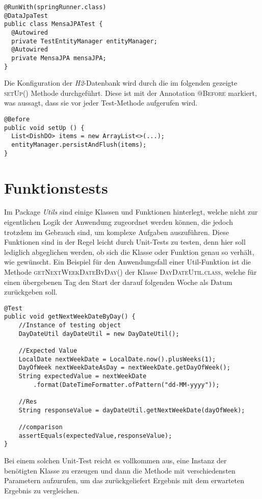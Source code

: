 \begin{lstlisting}[caption={Testen von Fehlverhalten}, commentstyle=\color{green},]
@RunWith(springRunner.class)
@DataJpaTest
public class MensaJPATest {
  @Autowired
  private TestEntityManager entityManager;
  @Autowired
  private MensaJPA mensaJPA;
}
\end{lstlisting}

Die Konfiguration der \textit{H2}-Datenbank wird durch die im folgenden gezeigte \textsc{setUp()} Methode durchgeführt. Diese ist mit der Annotation \textsc{@Before} markiert, was aussagt, dass sie vor jeder Test-Methode aufgerufen wird.

\begin{lstlisting}[caption={Testen von Fehlverhalten}, commentstyle=\color{green},]
@Before
public void setUp () {
  List<DishDO> items = new ArrayList<>(...);
  entityManager.persistAndFlush(items);
}
\end{lstlisting}

\section{Funktionstests}

Im Package \textit{Utils} sind einige Klassen und Funktionen hinterlegt, welche nicht zur eigentlichen Logik der Anwendung zugeordnet werden können, die jedoch trotzdem im Gebrauch sind, um komplexe Aufgaben auszuführen. Diese Funktionen sind in der Regel leicht durch Unit-Tests zu testen, denn hier soll lediglich abgeglichen werden, ob sich die Klasse oder Funktion genau so verhält, wie gewünscht. Ein Beispiel für den Anwendungsfall einer Util-Funktion ist die Methode \textsc{getNextWeekDateByDay()} der Klasse \textsc{DayDateUtil.class}, welche für einen übergebenen Tag den Start der darauf folgenden Woche als Datum zurückgeben soll.

\begin{lstlisting}[caption={Testen von Fehlverhalten}, commentstyle=\color{green},]
@Test
public void getNextWeekDateByDay() {
    //Instance of testing object
    DayDateUtil dayDateUtil = new DayDateUtil();

    //Expected Value
    LocalDate nextWeekDate = LocalDate.now().plusWeeks(1);
    DayOfWeek nextWeekDateAsDay = nextWeekDate.getDayOfWeek();
    String expectedValue = nextWeekDate
        .format(DateTimeFormatter.ofPattern("dd-MM-yyyy"));

    //Res
    String responseValue = dayDateUtil.getNextWeekDate(dayOfWeek);

    //comparison
    assertEquals(expectedValue,responseValue);
}
\end{lstlisting}

Bei einem solchen Unit-Test reicht es vollkommen aus, eine Instanz der benötigten Klasse zu erzeugen und dann die Methode mit verschiedensten Parametern aufzurufen, um das zurückgeliefert Ergebnis mit dem erwarteten Ergebnis zu vergleichen.